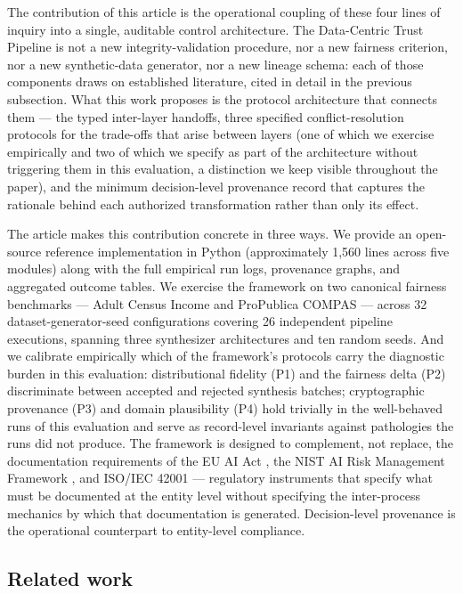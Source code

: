 \documentclass[11pt]{article}
\begin{document}
The contribution of this article is the operational coupling of these four lines of inquiry into a single, auditable control architecture. The Data-Centric Trust Pipeline is not a new integrity-validation procedure, nor a new fairness criterion, nor a new synthetic-data generator, nor a new lineage schema: each of those components draws on established literature, cited in detail in the previous subsection. What this work proposes is the protocol architecture that connects them --- the typed inter-layer handoffs, three specified conflict-resolution protocols for the trade-offs that arise between layers (one of which we exercise empirically and two of which we specify as part of the architecture without triggering them in this evaluation, a distinction we keep visible throughout the paper), and the minimum decision-level provenance record that captures the rationale behind each authorized transformation rather than only its effect.

The article makes this contribution concrete in three ways. We provide an open-source reference implementation in Python (approximately 1,560 lines across five modules) along with the full empirical run logs, provenance graphs, and aggregated outcome tables. We exercise the framework on two canonical fairness benchmarks --- Adult Census Income and ProPublica COMPAS --- across 32 dataset-generator-seed configurations covering 26 independent pipeline executions, spanning three synthesizer architectures and ten random seeds. And we calibrate empirically which of the framework's protocols carry the diagnostic burden in this evaluation: distributional fidelity (P1) and the fairness delta (P2) discriminate between accepted and rejected synthesis batches; cryptographic provenance (P3) and domain plausibility (P4) hold trivially in the well-behaved runs of this evaluation and serve as record-level invariants against pathologies the runs did not produce. The framework is designed to complement, not replace, the documentation requirements of the EU AI Act \cite{EU_AI_Act}, the NIST AI Risk Management Framework \cite{NIST_AIRM_2023}, and ISO/IEC 42001 \cite{ISO_42001_2023} --- regulatory instruments that specify what must be documented at the entity level without specifying the inter-process mechanics by which that documentation is generated. Decision-level provenance is the operational counterpart to entity-level compliance.

\subsection{Related work}
\label{sec:related}
\end{document}
